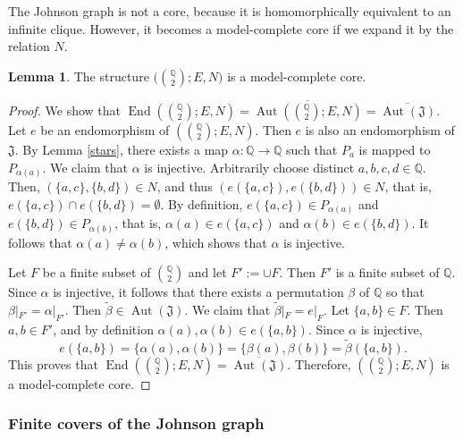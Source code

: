 \documentclass{amsart}
\theoremstyle{definition}
\newtheorem{lemma}[theorem]{Lemma}
\theoremstyle{remark}
\numberwithin{equation}{section}
\newcommand{\aut}{\operatorname{Aut}}
\newcommand{\eend}{\operatorname{End}}
\newcommand{\upairs}{{{\mathbb Q}\choose 2}}
\newcommand{\john}{\mathfrak{J}}
\begin{document}
	The Johnson graph is not a core, because it is homomorphically equivalent to an infinite clique. However, it becomes a model-complete core if we expand it by the relation $N$.

\begin{lemma}\label{core1}
	The structure $\big (\upairs;E,N \big)$ is a model-complete core.
\end{lemma}

\begin{proof}
	We show that $\eend(\upairs;E,N)=\overline{\aut(\upairs;E,N)}=\overline{\aut(\john)}$. Let $e$ be an endomorphism of $(\upairs;E,N)$. Then $e$ is also an endomorphism of $\john$. By Lemma \ref{stars}, 
    there exists a map $\alpha \colon {\mathbb Q} \rightarrow {\mathbb Q}$ such that $P_a$ is mapped to $P_{\alpha(a)}$. We claim that $\alpha$ is injective. Arbitrarily choose distinct $a,b,c,d\in {\mathbb Q}$. 
    Then, {$(\{a,c\},\{b,d\})\in N$, and thus $(e(\{a,c\}),e(\{b,d\}))\in N$,}  that is, $e(\{a,c\})\cap e(\{b,d\})=\emptyset$. By definition, $e(\{a,c\})\in P_{\alpha(a)}$ and $e(\{b,d\})\in P_{\alpha(b)}$, that is, $\alpha(a)\in e(\{a,c\})$ and $\alpha(b)\in e(\{b,d\})$. It follows that $\alpha(a)\neq \alpha(b)$, which shows that $\alpha$ is injective. 
    
    Let $F$ be a finite subset of $\upairs$ and let $F':=\cup F$. Then $F'$ is a finite subset of ${\mathbb Q}$. Since $\alpha$ is injective, it follows that there exists a permutation $\beta$ of ${\mathbb Q}$ so that $\beta|_{F'}=\alpha|_{F'}$. Then $\tilde{\beta}\in \aut(\john)$. We claim that $\tilde{\beta}|_{F}=e|_{F}$. Let $\{a,b\}\in F$. Then $a,b\in F'$, and by definition $\alpha(a),\alpha(b)\in e(\{a,{b}\})$. Since $\alpha$ is injective,  
    $$e(\{a,b\})=\{\alpha(a),\alpha(b)\}=\{\beta(a),\beta(b)\}=\tilde{\beta}(\{a,b\}).$$ This proves that $\eend(\upairs;E,N)=\overline{\aut(\john)}$. Therefore, $(\upairs;E,N)$ is a model-complete core.
\end{proof}


\subsubsection{Finite covers of the Johnson graph}
\end{document}

